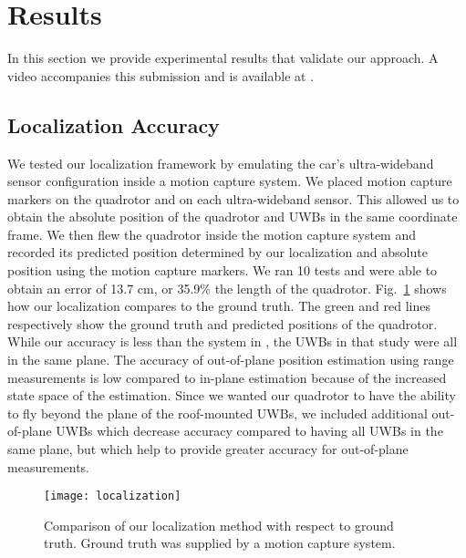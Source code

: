 
\section{Results}

In this section we provide experimental results that validate our approach. A video accompanies this submission and is available at .

\subsection{Localization Accuracy}

We tested our localization framework by emulating the car's ultra-wideband
sensor configuration inside a motion capture system. We placed motion capture
markers on the quadrotor and on each ultra-wideband sensor. This allowed us to
obtain the absolute position of the quadrotor and UWBs in the same coordinate
frame. We then flew the quadrotor inside the motion capture system and recorded
its predicted position determined by our localization and absolute position
using the motion capture markers. We ran 10 tests and were able to obtain an error of
13.7 cm, or 35.9\% the length of the quadrotor. Fig.~\ref{fig:localization}
shows how our localization compares to the ground truth. The green and red
lines respectively show the ground truth and predicted positions of the
quadrotor. While our accuracy is less than the system in \cite{tobiuwb}, the UWBs
in that study were all in the same plane. The accuracy of out-of-plane position estimation
using range measurements is low compared to in-plane estimation because of the
increased state space of the estimation. Since we wanted
our quadrotor to have the ability to fly beyond the plane of the roof-mounted UWBs,
we included additional out-of-plane UWBs which decrease accuracy compared to
having all UWBs in the same plane, but which help to provide greater accuracy for
out-of-plane measurements.



\begin{figure}

    \centering

    \texttt{[image: localization]}

    \caption{Comparison of our localization method with respect to
    ground truth. Ground truth was supplied by a motion capture system.}

    \label{fig:localization}

\end{figure}

